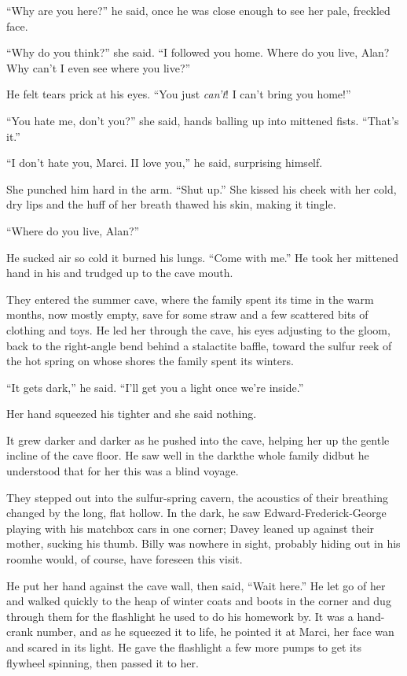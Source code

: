 ``Why are you here?'' he said, once he was close enough to see her
pale, freckled face.

``Why do you think?'' she said.  ``I followed you home.  Where do you
live, Alan?  Why can't I even see where you live?''

He felt tears prick at his eyes.  ``You just \textit{can't}!  I can't
bring you home!''

``You hate me, don't you?'' she said, hands balling up into mittened
fists.  ``That's it.''

``I don't hate you, Marci.  I\dash{}I love you,'' he said, surprising
himself.

She punched him hard in the arm.  ``Shut up.'' She kissed his cheek
with her cold, dry lips and the huff of her breath thawed his skin,
making it tingle.

``Where do you live, Alan?''

He sucked air so cold it burned his lungs.  ``Come with me.'' He took
her mittened hand in his and trudged up to the cave mouth.

They entered the summer cave, where the family spent its time in the
warm months, now mostly empty, save for some straw and a few scattered
bits of clothing and toys.  He led her through the cave, his eyes
adjusting to the gloom, back to the right-angle bend behind a
stalactite baffle, toward the sulfur reek of the hot spring on whose
shores the family spent its winters.

``It gets dark,'' he said.  ``I'll get you a light once we're
inside.''

Her hand squeezed his tighter and she said nothing.

It grew darker and darker as he pushed into the cave, helping her up
the gentle incline of the cave floor.  He saw well in the dark\dash{}the
whole family did\dash{}but he understood that for her this was a blind
voyage.

They stepped out into the sulfur-spring cavern, the acoustics of their
breathing changed by the long, flat hollow.  In the dark, he saw
Edward-Frederick-George playing with his matchbox cars in one corner;
Davey leaned up against their mother, sucking his thumb.  Billy was
nowhere in sight, probably hiding out in his room\dash{}he would, of
course, have foreseen this visit.

He put her hand against the cave wall, then said, ``Wait here.'' He
let go of her and walked quickly to the heap of winter coats and boots
in the corner and dug through them for the flashlight he used to do
his homework by.  It was a hand-crank number, and as he squeezed it to
life, he pointed it at Marci, her face wan and scared in its light. 
He gave the flashlight a few more pumps to get its flywheel spinning,
then passed it to her.

